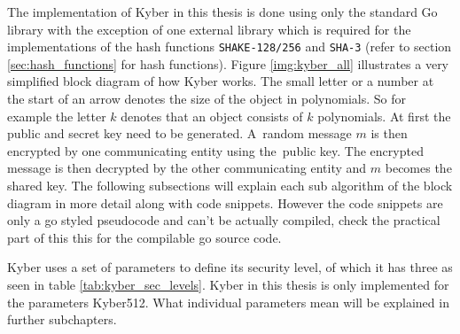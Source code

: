 The implementation of Kyber in this thesis is done using only the standard Go library with the exception of one external library \cite{00fV2cvg7Z6H2tS3} which is required for the implementations of the hash functions \texttt{SHAKE-128/256} and \texttt{SHA-3} (refer to section \ref{sec:hash_functions} for hash functions). Figure \ref{img:kyber_all} illustrates a very simplified block diagram of how Kyber works. The small letter or a number at the start of an arrow denotes the size of the object in polynomials. So for example the letter $k$ denotes that an object consists of $k$ polynomials. At first the public and secret key need to be generated. A~random message $m$ is then encrypted by one communicating entity using the~public key. The encrypted message is then decrypted by the other communicating entity and $m$ becomes the shared key. The following subsections will explain each sub algorithm of the block diagram in more detail along with code snippets. However the code snippets are only a go styled pseudocode and can't be actually compiled, check the practical part of this this for the compilable go source code.

Kyber uses a set of parameters to define its security level, of which it has three as seen in table \ref{tab:kyber_sec_levels}. Kyber in this thesis is only implemented for the parameters Kyber512. What individual parameters mean will be explained in further subchapters.

